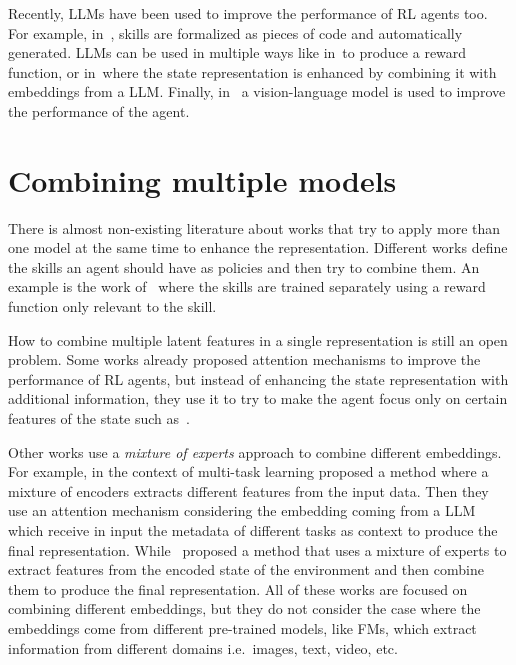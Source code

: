 Recently, LLMs have been used to improve the performance of RL agents too.
For example, in~\citet{wang2023voyager}, skills are formalized as pieces of code and automatically generated.
LLMs can be used in multiple ways like in~\citet{yu2023language}to produce a reward function, or in~\citet{lifshitz2024steve}where the state representation is enhanced by combining it with embeddings from a LLM\@.
Finally, in~\citet{brohan2023rt} a vision-language model is used to improve the performance of the agent.




\section{Combining multiple models}\label{sec:fm_rl_combination}
There is almost non-existing literature about works that try to apply more than one model at the same time to enhance the representation.
Different works define the skills an agent should have as policies and then try to combine them.
An example is the work of~\citet{sahni2017learning} where the skills are trained separately using a reward function only relevant to the skill.

How to combine multiple latent features in a single representation is still an open problem.
Some works already proposed attention mechanisms to improve the performance of RL agents, but instead of enhancing the state representation with additional information, they use it to try to make the agent focus only on certain features of the state such as~\citet{bramlage2022generalized, blakeman2022selective}.

Other works use a \textit{mixture of experts} approach to combine different embeddings.
For example, in the context of multi-task learning \citet{sodhani2021multi} proposed a method where a mixture of encoders extracts different features from the input data.
Then they use an attention mechanism considering the embedding coming from a LLM which receive in input the metadata of different tasks as context to produce the final representation.
While~\citet{obando2024mixtures} proposed a method that uses a mixture of experts to extract features from the encoded state of the environment and then combine them to produce the final representation.
All of these works are focused on combining different embeddings, but they do not consider the case where the embeddings come from different pre-trained models, like FMs, which extract information from different domains i.e.\ images, text, video, etc.

